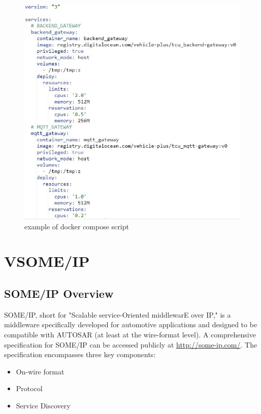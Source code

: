 \documentclass[
12pt,
oneside, 
onehalfspacing, 
nolistspacing, 
parskip, 
chapterinoneline, 
]{AASTCOMPUTER}
\begin{document}
\clearpage

\begin{figure}[h]
\centering
\includegraphics[scale=0.6]{Figures/docker_compose_script.JPG}
\caption[docker compose script]{example of docker compose script}
\label{fig:docker_compose_script}
\end{figure}

\section{VSOME/IP}
\subsection{SOME/IP Overview}
SOME/IP, short for "Scalable service-Oriented middlewarE over IP," is a middleware specifically developed for automotive applications and designed to be compatible with AUTOSAR (at least at the wire-format level). A comprehensive specification for SOME/IP can be accessed publicly at \url{http://some-ip.com/}. The specification encompasses three key components:
\begin{itemize}
\item On-wire format
\item Protocol
\item Service Discovery
\end{itemize}
\end{document}
